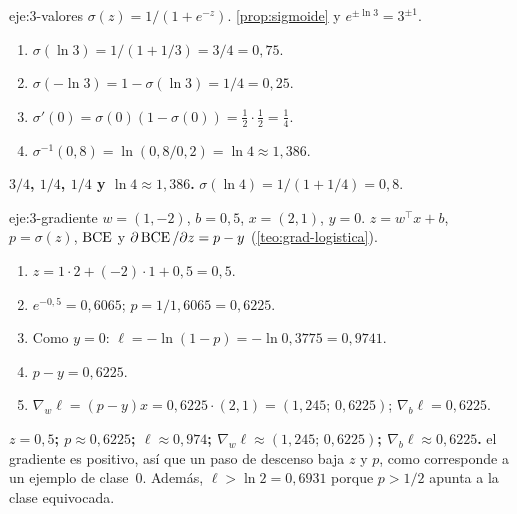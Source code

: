 \begin{solucion}{eje:3-valores}
\datos $\sigma(z)=1/(1+e^{-z})$.
\planteamiento \cref{prop:sigmoide} y $e^{\pm\ln 3}=3^{\pm 1}$.
\pasos
\begin{enumerate}[label=\arabic*.]
  \item $\sigma(\ln 3)=1/(1+1/3)=3/4=0{,}75$.
  \item $\sigma(-\ln 3)=1-\sigma(\ln 3)=1/4=0{,}25$.
  \item $\sigma'(0)=\sigma(0)(1-\sigma(0))=\frac12\cdot\frac12=\frac14$.
  \item $\sigma^{-1}(0{,}8)=\ln(0{,}8/0{,}2)=\ln 4\approx 1{,}386$.
\end{enumerate}
\resultado \textbf{$3/4$, $1/4$, $1/4$ y $\ln 4\approx 1{,}386$.}
\comprobacion $\sigma(\ln 4)=1/(1+1/4)=0{,}8$.
\end{solucion}

\begin{solucion}{eje:3-gradiente}
\datos $w=(1,-2)$, $b=0{,}5$, $x=(2,1)$, $y=0$.
\planteamiento $z=w^{\top}x+b$, $p=\sigma(z)$, $\operatorname{BCE}$ y $\partial\operatorname{BCE}/\partial z=p-y$ (\cref{teo:grad-logistica}).
\pasos
\begin{enumerate}[label=\arabic*.]
  \item $z=1\cdot 2+(-2)\cdot 1+0{,}5=0{,}5$.
  \item $e^{-0{,}5}=0{,}6065$; $p=1/1{,}6065=0{,}6225$.
  \item Como $y=0$: $\ell=-\ln(1-p)=-\ln 0{,}3775=0{,}9741$.
  \item $p-y=0{,}6225$.
  \item $\nabla_w\ell=(p-y)x=0{,}6225\cdot(2,1)=(1{,}245;\,0{,}6225)$; $\nabla_b\ell=0{,}6225$.
\end{enumerate}
\resultado \textbf{$z=0{,}5$; $p\approx 0{,}6225$; $\ell\approx 0{,}974$; $\nabla_w\ell\approx(1{,}245;\,0{,}6225)$; $\nabla_b\ell\approx 0{,}6225$.}
\comprobacion el gradiente es positivo, así que un paso de descenso baja $z$ y $p$, como corresponde a un ejemplo de clase~0. Además, $\ell>\ln 2=0{,}6931$ porque $p>1/2$ apunta a la clase equivocada.
\end{solucion}

